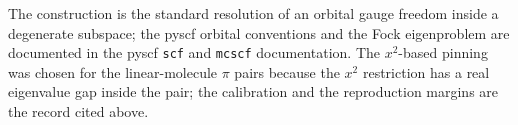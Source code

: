 The construction is the standard resolution of an orbital gauge
freedom inside a degenerate subspace; the pyscf orbital conventions and
the Fock eigenproblem are documented in the pyscf \texttt{scf} and
\texttt{mcscf} documentation.  The $x^{2}$-based pinning was chosen for
the linear-molecule $\pi$ pairs because the $x^{2}$ restriction has a
real eigenvalue gap inside the pair; the calibration and the
reproduction margins are the record cited above.

